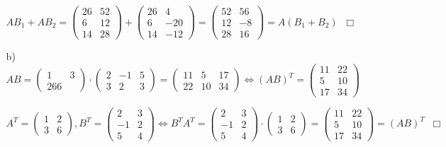\documentclass[a4paper,10pt]{scrartcl}
\begin{document}
\begin{enumerate}
\begin{enumerate}
                $AB_1 + AB_2 =
                    \begin{pmatrix} 26 & 52 \\ 6 & 12 \\ 14  & 28 \end{pmatrix} +
                    \begin{pmatrix} 26 & 4 \\ 6 & -20 \\ 14  & -12 \end{pmatrix} =
                    \begin{pmatrix} 52 & 56 \\ 12 & -8 \\ 28 & 16 \end{pmatrix}
                    = A(B_1 + B_2) \;\;\Box
                    $

            \item[b)]
                $AB =
                    \begin{pmatrix}1 & 3 \\ 2 6 6 \end{pmatrix} \cdot
                    \begin{pmatrix}2 & -1 & 5 \\ 3 & 2 & 3 \end{pmatrix} =
                    \begin{pmatrix}11 & 5 & 17 \\ 22 & 10 & 34\end{pmatrix}
                \Leftrightarrow
                 (AB)^T =
                    \begin{pmatrix}11 & 22 \\ 5 & 10 \\ 17 & 34\end{pmatrix}
                    $

                $A^T = \begin{pmatrix} 1 & 2 \\ 3 & 6 \end{pmatrix}, B^T = \begin{pmatrix} 2 & 3 \\ -1 & 2 \\ 5 & 4 \end{pmatrix}
                    \Leftrightarrow
                    B^TA^T =
                    \begin{pmatrix} 2 & 3 \\ -1 & 2 \\ 5 & 4 \end{pmatrix} \cdot
                    \begin{pmatrix} 1 & 2 \\ 3 & 6 \end{pmatrix} =
                    \begin{pmatrix}11 & 22 \\ 5 & 10 \\ 17 & 34\end{pmatrix} =
                    (AB)^T \;\;\Box
                    $


\end{enumerate}
\end{enumerate}
\end{document}
